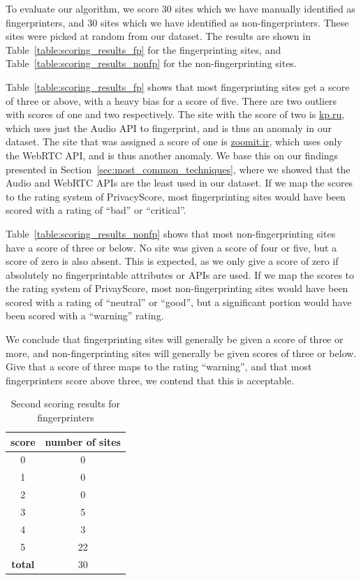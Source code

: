 \documentclass[
    fontsize=12pt,
    headings=small,
    parskip=half,
    bibliography=totoc,
    numbers=noenddot,
    open=any
    ]{scrreprt}
\begin{document}
To evaluate our algorithm, we score 30 sites which we have manually identified as fingerprinters,
and 30 sites which we have identified as non-fingerprinters.
These sites were picked at random from our dataset.
The results are shown in Table~\ref{table:scoring_results_fp} for the fingerprinting sites,
and Table~\ref{table:scoring_results_nonfp} for the non-fingerprinting sites.

Table~\ref{table:scoring_results_fp} shows that most fingerprinting sites get a score of
three or above, with a heavy bias for a score of five.
There are two outliers with scores of one and two respectively. The site with the score of two is \url{kp.ru},
which uses just the Audio API to fingerprint, and is thus an anomaly in our dataset.
The site that was assigned a score of one is \url{zoomit.ir}, which uses only the WebRTC API,
and is thus another anomaly. We base this on our findings presented in Section~\ref{sec:most_common_techniques},
where we showed that the Audio and WebRTC APIs are the least used in our dataset.
If we map the scores to the rating system of PrivacyScore, most fingerprinting sites would have been scored
with a rating of ``bad'' or ``critical''.

Table~\ref{table:scoring_results_nonfp} shows that most non-fingerprinting sites
have a score of three or below.
No site was given a score of four or five, but a score of zero is also absent.
This is expected, as we only give a score of zero if absolutely no fingerprintable
attributes or APIs are used.
If we map the scores to the rating system of PrivayScore, most non-fingerprinting sites would
have been scored with a rating of ``neutral'' or ``good'', but a significant portion
would have been scored with a ``warning'' rating.

We conclude that fingerprinting sites will generally be given a score of three or more,
and non-fingerprinting sites will generally be given scores of three or below.
Give that a score of three maps to the rating ``warning'', and that most fingerprinters
score above three, we contend that this is acceptable.

\begin{table}
\centering
\caption{Second scoring results for fingerprinters}
\begin{tabular}{c c}
    \toprule
    \textbf{score} & \textbf{number of sites} \\
    \midrule
    0 & 0 \\
    1 & 0 \\
    2 & 0 \\
    3 & 5 \\
    4 & 3 \\
    5 & 22 \\
    \midrule
    \textbf{total} & 30 \\
    \bottomrule
\end{tabular}
\label{table:scoring_results_fp_2}
\end{table}
\end{document}
